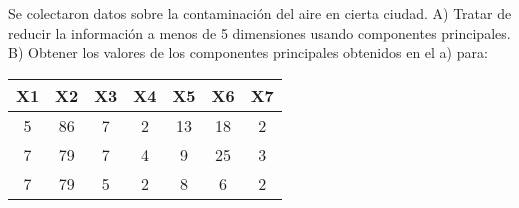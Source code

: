 \begin{problem}{2}
Se colectaron datos sobre la contaminación del aire en cierta ciudad.
A) Tratar de reducir la información a menos de 5 dimensiones usando componentes principales.
B) Obtener los valores de los componentes principales obtenidos en el a) para:
\begin{table}[h]
    \centering
    \begin{tabular}{|c|c|c|c|c|c|c|}
        \hline
        \textbf{X1} & \textbf{X2} & \textbf{X3} & \textbf{X4} & \textbf{X5} & \textbf{X6} & \textbf{X7} \\
        \hline
        5 & 86 & 7 & 2 & 13 & 18 & 2 \\
        7 & 79 & 7 & 4 & 9 & 25 & 3 \\
        7 & 79 & 5 & 2 & 8 & 6 & 2 \\
        \hline
    \end{tabular}
    \label{tab:datos}
\end{table}
\end{problem}

